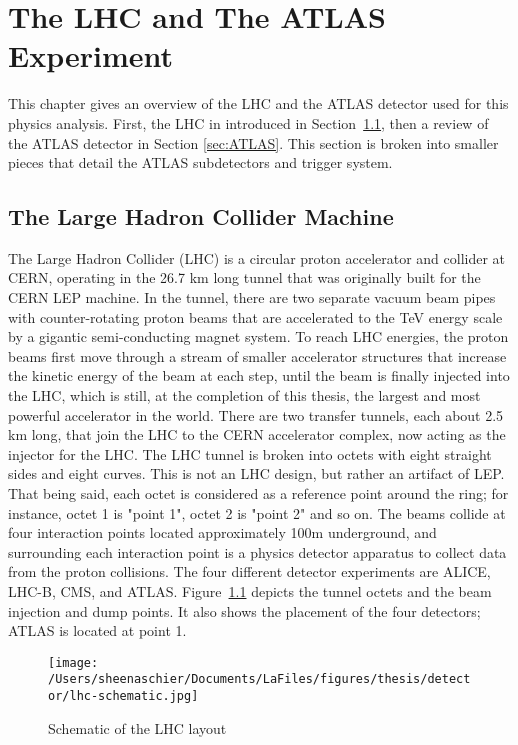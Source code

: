 \chapter{The LHC and The ATLAS Experiment}
\label{ch:detector}
This chapter gives an overview of the LHC and the ATLAS detector used for this physics analysis.  First, the LHC in introduced in Section~\ref{sec:LHC}, then a review of the ATLAS detector in Section \ref{sec:ATLAS}.  This section is broken into smaller pieces that detail the ATLAS subdetectors and trigger system. %
\section{The Large Hadron Collider Machine}
\label{sec:LHC}

The Large Hadron Collider (LHC) is a circular proton accelerator and collider at CERN, operating in the 26.7 km long tunnel that was originally built for the CERN LEP machine.  In the tunnel, there are two separate vacuum beam pipes with counter-rotating proton beams that are accelerated to the TeV energy scale by a gigantic semi-conducting magnet system.  To reach LHC energies, the proton beams first move through a stream of smaller accelerator structures that increase the kinetic energy of the beam at each step, until the beam is finally injected into the LHC, which is still, at the completion of this thesis, the largest and most powerful accelerator in the world.  There are two transfer tunnels, each about 2.5 km long, that join the LHC to the CERN accelerator complex, now acting as the injector for the LHC.  The LHC tunnel is broken into octets with eight straight sides and eight curves.  This is not an LHC design, but rather an artifact of LEP.   That being said, each octet is considered as a reference point around the ring; for instance, octet 1 is "point 1", octet 2 is "point 2" and so on.  The beams collide at four interaction points located approximately 100m underground, and surrounding each interaction point is a physics detector apparatus to collect data from the proton collisions.  The four different detector experiments are ALICE, LHC-B, CMS, and ATLAS.  Figure~\ref{fig:lhc} depicts the tunnel octets and the beam injection and dump points.  It also shows the placement of the four detectors; ATLAS is located at point 1.
  \begin{figure}[tbp]
    \centering
 \texttt{[image: /Users/sheenaschier/Documents/LaFiles/figures/thesis/detector/lhc-schematic.jpg]}
    \caption{Schematic of the LHC layout}
   \label{fig:lhc}
 \end{figure}
 
